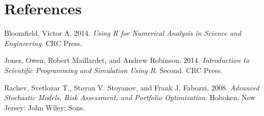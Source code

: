 \documentclass[11pt,]{article}
\begin{document}
\section*{References}\label{references}

\hypertarget{refs}{}
\hypertarget{ref-Bloomfield:2014}{}
Bloomfield, Victor A. 2014. \emph{Using R for Numerical Analysis in
Science and Engineering}. CRC Press.

\hypertarget{ref-Jones_et_al:2014}{}
Jones, Owen, Robert Maillardet, and Andrew Robinson. 2014.
\emph{Introduction to Scientific Programming and Simulation Using R}.
Second. CRC Press.

\hypertarget{ref-Rachev:2008}{}
Rachev, Svetlozar T., Stoyan V. Stoyanov, and Frank J. Fabozzi. 2008.
\emph{Advanced Stochastic Models, Risk Assessment, and Portfolio
Optimization}. Hoboken, New Jersey: John Wiley; Sons.
\end{document}
